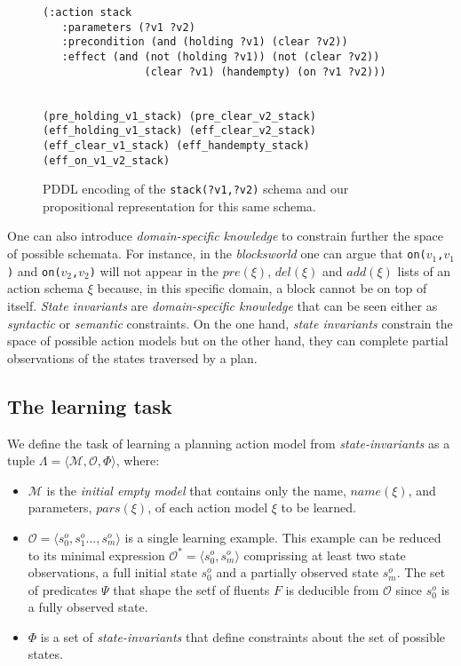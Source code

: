 \documentclass{article}
\newcommand{\tup}[1]{{\langle #1 \rangle}}
\begin{document}
\begin{figure}
  \begin{tiny}  
  \begin{verbatim}
(:action stack
   :parameters (?v1 ?v2)
   :precondition (and (holding ?v1) (clear ?v2))
   :effect (and (not (holding ?v1)) (not (clear ?v2))
                (clear ?v1) (handempty) (on ?v1 ?v2)))


(pre_holding_v1_stack) (pre_clear_v2_stack)
(eff_holding_v1_stack) (eff_clear_v2_stack)
(eff_clear_v1_stack) (eff_handempty_stack) (eff_on_v1_v2_stack)
  \end{verbatim}           
  \end{tiny}  
 \caption{\small PDDL encoding of the {\tt\small stack(?v1,?v2)} schema and our propositional representation for this same schema.}
\label{fig:propositional}
\end{figure}

One can also introduce {\em domain-specific knowledge} to constrain further the space of possible schemata. For instance, in the {\em blocksworld} one can argue that {\small\tt on($v_1$,$v_1$)} and {\small\tt on($v_2$,$v_2$)} will not appear in the $pre(\xi)$, $del(\xi)$ and $add(\xi)$ lists of an action schema $\xi$ because, in this specific domain, a block cannot be on top of itself. {\it State invariants} are {\em domain-specific knowledge} that can be seen either as {\em syntactic} or {\em semantic} constraints. On the one hand, {\it state invariants} constrain the space of possible action models but on the other hand, they can complete partial observations of the states traversed by a plan.

\subsection{The learning task}
We define the task of learning a planning action model from {\em state-invariants} as a tuple $\Lambda=\tup{\mathcal{M},{\mathcal O},\Phi}$, where:
\begin{itemize}
\item $\mathcal{M}$ is the {\em initial empty model} that contains only the name, $name(\xi)$, and parameters, $pars(\xi)$, of each action model $\xi$ to be learned.
\item $\mathcal{O}=\tup{s_0^o,s_1^o \ldots, s_m^o}$ is a single learning example. This example can be reduced to its minimal expression $\mathcal{O}^*=\tup{s_0^o, s_m^o}$ comprissing at least two state observations, a full initial state $s_0^o$ and a partially observed state $s_m^o$. The set of predicates $\Psi$ that shape the setf of fluents $F$ is deducible from $\mathcal{O}$ since $s_0^o$ is a fully observed state.
\item $\Phi$ is a set of {\em state-invariants} that define constraints about the set of possible states.
\end{itemize}
\end{document}
